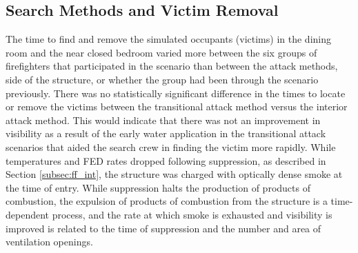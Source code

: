 \documentclass[12pt,oneside]{article}
\begin{document}
\subsection{Search Methods and Victim Removal}
The time to find and remove the simulated occupants (victims) in the dining room and the near closed bedroom varied more between the six groups of firefighters that participated in the scenario than between the attack methods, side of the structure, or whether the group had been through the scenario previously. There was no statistically significant difference in the times to locate or remove the victims between the transitional attack method versus the interior attack method. This would indicate that there was not an improvement in visibility as a result of the early water application in the transitional attack scenarios that aided the search crew in finding the victim more rapidly. While temperatures and FED rates dropped following suppression, as described in Section \ref{subsec:ff_int}, the structure was charged with optically dense smoke at the time of entry. While suppression halts the production of products of combustion, the expulsion of products of combustion from the structure is a time-dependent process, and the rate at which smoke is exhausted and visibility is improved is related to the time of suppression and the number and area of ventilation openings.
\end{document}
